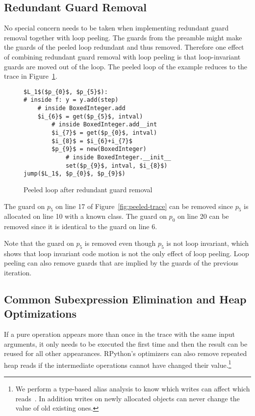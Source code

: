 \documentclass[preprint]{sigplanconf}
\let\oldcite=\cite
\renewcommand\cite[1]{\ifthenelse{\equal{#1}{XXX}}{[citation~needed]}{\oldcite{#1}}}
\begin{document}
\subsection{Redundant Guard Removal}

No special concern needs to be taken when implementing redundant
guard removal together with loop peeling. The guards from
the preamble might make the guards of the peeled loop
redundant and thus removed. Therefore one effect of combining redundant
guard removal with loop peeling is that loop-invariant guards are moved out of the
loop. The peeled loop of the example reduces to the trace in Figure~\ref{fig:guard-trace}.

\begin{figure}
\begin{lstlisting}[mathescape,numbers = right,basicstyle=\setstretch{1.05}\ttfamily\scriptsize]
$L_1$($p_{0}$, $p_{5}$):
# inside f: y = y.add(step)
    # inside BoxedInteger.add
    $i_{6}$ = get($p_{5}$, intval)
        # inside BoxedInteger.add__int
        $i_{7}$ = get($p_{0}$, intval)
        $i_{8}$ = $i_{6}+i_{7}$
        $p_{9}$ = new(BoxedInteger)
            # inside BoxedInteger.__init__
            set($p_{9}$, intval, $i_{8}$)
jump($L_1$, $p_{0}$, $p_{9}$)
\end{lstlisting}
\caption{Peeled loop after redundant guard removal}
\label{fig:guard-trace}
\end{figure}

The guard on $p_5$ on line 17 of Figure~\ref{fig:peeled-trace} can be
removed since $p_5$ is allocated on line 10 with a known class. The
guard on $p_0$ on line 20 can be removed since it is identical to the
guard on line 6.

Note that the guard on $p_5$ is removed even though $p_5$ is not loop
invariant, which shows that loop invariant code motion is not the only
effect of loop peeling. Loop peeling can also remove guards that are implied by
the guards of the previous iteration.



\subsection{Common Subexpression Elimination and Heap Optimizations}

If a pure operation appears more than once in the trace with the same input
arguments, it only needs to be executed the first time and then the result
can be reused for all other appearances. RPython's optimizers can also remove
repeated heap reads if the intermediate operations cannot have changed their
value.\footnote{We perform a type-based alias analysis to know which
writes can affect which reads~\cite{XXX}. In addition writes on newly allocated objects
can never change the value of old existing ones.}
\end{document}
